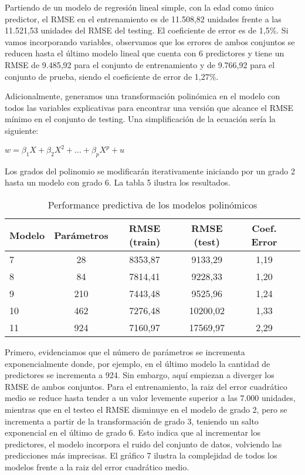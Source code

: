\documentclass[11pt,oneside]{article}
\begin{document}
	
	Partiendo de un modelo de regresión lineal simple, con la edad como único predictor, el RMSE en el entrenamiento es de 11.508,82 unidades frente a las 11.521,53 unidades del RMSE del testing. El coeficiente de error es de 1,5\%. Si vamos incorporando variables, observamos que los errores de ambos conjuntos se reducen hasta el último modelo lineal que cuenta con 6 predictores y tiene un RMSE de 9.485,92 para el conjunto de entrenamiento y de 9.766,92 para el conjunto de prueba, siendo el coeficiente de error de 1,27\%. 
	
	Adicionalmente, generamos una transformación polinómica en el modelo con todos las variables explicativas para encontrar una versión que alcance el RMSE mínimo en el conjunto de testing. Una simplificación de la ecuación sería la siguiente:
	
	\begin{center}
		$w = \beta_{1}X + \beta_{2}X^2 + ... + \beta_{p}X^p + u$
	\end{center}
	
	Los grados del polinomio se modificarán iterativamente iniciando por un grado 2 hasta un modelo con grado 6. La tabla 5 ilustra los resultados.
	
	\begin{table}[H]
		\centering
		\begin{tabular}{lccccc}
			\hline
			\textbf{Modelo} & \textbf{Parámetros} & \textbf{RMSE (train)} & \textbf{RMSE (test)} & \textbf{Coef. Error} \\ \hline
			7  & 28  & 8353,87  & 9133,29  & 1,19 \\ 
			8  & 84  & 7814,41  & 9228,33  & 1,20 \\ 
			9  & 210 & 7443,48  & 9525,96  & 1,24 \\ 
			10 & 462 & 7276,48  & 10200,02 & 1,33 \\ 
			11 & 924 & 7160,97  & 17569,97 & 2,29 \\ \hline
		\end{tabular}
		\caption{Performance predictiva de los modelos polinómicos}
		\label{tab:modelos_rmse}
	\end{table}
	
	
	Primero, evidenciamos que el número de parámetros se incrementa exponencialmente donde, por ejemplo, en el último modelo la cantidad de predictores se incrementa a 924. Sin embargo, aquí empiezan a diverger los RMSE de ambos conjuntos. Para el entrenamiento, la raiz del error cuadrático medio se reduce hasta tender a un valor levemente superior a las 7.000 unidades, mientras que en el testeo el RMSE disminuye en el modelo de grado 2, pero se incrementa a partir de la transformación de grado 3, teniendo un salto exponencial en el último de grado 6. Esto indica que al incrementar los predictores, el modelo incorpora el ruido del conjunto de datos, volviendo las predicciones más imprecisas.  
	El gráfico 7 ilustra la complejidad de todos los modelos frente a la raiz del error cuadrático medio. 
	
\end{document}
